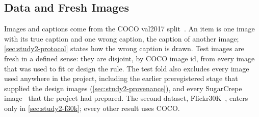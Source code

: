 \subsection{Data and Fresh Images}\label{sec:setting-data}
Images and captions come from the COCO val2017 split~\cite{lin2014coco}.
An item is one image with its true caption and one wrong caption, the caption of another image; \cref{sec:study2-protocol} states how the
wrong caption is drawn.
Test images are fresh in a defined sense: they are disjoint, by COCO image id, from every image that was used to fit or design the rule.
The test fold also excludes every image used anywhere in the project, including the earlier preregistered stage that supplied the design
images (\cref{sec:study2-provenance}), and every SugarCrepe image~\cite{hsieh2023sugarcrepe} that the project had prepared.
The second dataset, Flickr30K~\cite{young2014flickr30k}, enters only in \cref{sec:study2-f30k}; every other result uses COCO.
